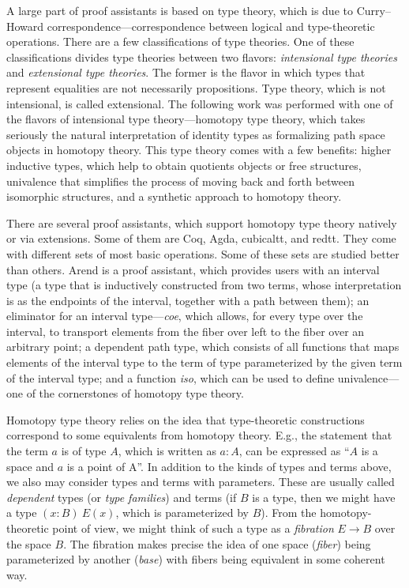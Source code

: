 A large part of proof assistants is based on type theory, which is due to Curry–Howard correspondence---correspondence between logical and type-theoretic operations. There are a few classifications of type theories. One of these classifications divides type theories between two flavors: \textit{intensional type theories} and \textit{extensional type theories}. The former is the flavor in which types that represent equalities are not necessarily propositions. Type theory, which is not intensional, is called extensional. The following work was performed with one of the flavors of intensional type theory---homotopy type theory, which takes seriously the natural interpretation of identity types as formalizing path space objects in homotopy theory. This type theory comes with a few benefits: higher inductive types, which help to obtain quotients objects or free structures, univalence that simplifies the process of moving back and forth between isomorphic structures, and a synthetic approach to homotopy theory.

There are several proof assistants, which support homotopy type theory natively or via extensions. Some of them are Coq\autocite{Coq}, Agda\autocite{Agda}, cubicaltt\autocite{Cubicaltt}, and redtt\autocite{Redtt}. They come with different sets of most basic operations. Some of these sets are studied better than others. Arend\autocite{Arend} is a proof assistant, which provides users with an interval type (a type that is inductively constructed from two terms, whose interpretation is as the endpoints of the interval, together with a path between them); an eliminator for an interval type---\textit{coe}, which allows, for every type over the interval, to transport elements from the fiber over left to the fiber over an arbitrary point; a dependent path type, which consists of all functions that maps elements of the interval type to the term of type parameterized by the given term of the interval type; and a function \textit{iso}, which can be used to define univalence---one of the cornerstones of homotopy type theory\autocite{Arenddocs}\autocite{nlab}.

Homotopy type theory relies on the idea that type-theoretic constructions correspond to some equivalents from homotopy theory. E.g., the statement that the term $a$ is of type $A$, which is written as $a:A$, can be expressed as ``$A$ is a space and $a$ is a point of A''. In addition to the kinds of types and terms above, we also may consider types and terms with parameters. These are usually called \textit{dependent} types (or \textit{type families}) and terms (if $B$ is a type, then we might have a type $(x:B)\ E(x)$, which is parameterized by $B$). From the homotopy-theoretic point of view, we might think of such a type as a \textit{fibration} $E \to B$ over the space $B$. The fibration makes precise the idea of one space (\textit{fiber}) being parameterized by another (\textit{base}) with fibers being equivalent in some coherent way.

